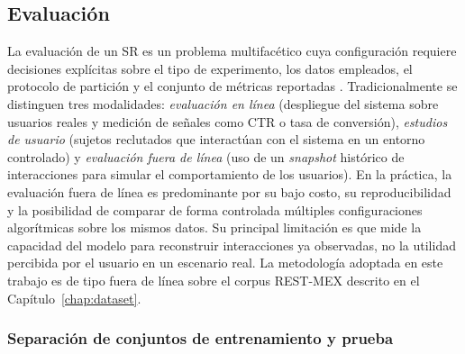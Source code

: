%

\subsection{Evaluación} \label{subsec:evaluation}

La evaluación de un SR es un problema multifacético cuya configuración requiere decisiones explícitas sobre el tipo de experimento, los datos empleados, el protocolo de partición y el conjunto de métricas reportadas \citep{zangerle_evaluating_2022}. Tradicionalmente se distinguen tres modalidades: \textit{evaluación en línea} (despliegue del sistema sobre usuarios reales y medición de señales como CTR o tasa de conversión), \textit{estudios de usuario} (sujetos reclutados que interactúan con el sistema en un entorno controlado) y \textit{evaluación fuera de línea} (uso de un \textit{snapshot} histórico de interacciones para simular el comportamiento de los usuarios). En la práctica, la evaluación fuera de línea es predominante por su bajo costo, su reproducibilidad y la posibilidad de comparar de forma controlada múltiples configuraciones algorítmicas sobre los mismos datos. Su principal limitación es que mide la capacidad del modelo para reconstruir interacciones ya observadas, no la utilidad percibida por el usuario en un escenario real. La metodología adoptada en este trabajo es de tipo fuera de línea sobre el corpus REST-MEX descrito en el Capítulo~\ref{chap:dataset}.

\subsubsection{Separación de conjuntos de entrenamiento y prueba} \label{subsubsec:train_test_split}

